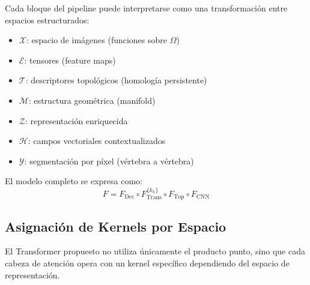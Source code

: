 \documentclass[conference]{IEEEtran}
\begin{document}
Cada bloque del pipeline puede interpretarse como una transformación entre espacios estructurados:

\begin{itemize}
    \item $\mathcal{X}$: espacio de imágenes (funciones sobre $\Omega$)
    \item $\mathcal{E}$: tensores (feature maps)
    \item $\mathcal{T}$: descriptores topológicos (homología persistente)
    \item $\mathcal{M}$: estructura geométrica (manifold)
    \item $\mathcal{Z}$: representación enriquecida
    \item $\mathcal{H}$: campos vectoriales contextualizados
    \item $\mathcal{Y}$: segmentación por píxel (vértebra a vértebra)
\end{itemize}

El modelo completo se expresa como:
\[
F = F_{\text{Dec}} \circ F_{\text{Trans}}^{\{k_h\}} \circ F_{\text{Top}} \circ F_{\text{CNN}}
\]

\subsection{Asignación de Kernels por Espacio}

El Transformer propuesto no utiliza únicamente el producto punto, sino que cada cabeza de atención opera con un kernel específico dependiendo del espacio de representación.
\end{document}
